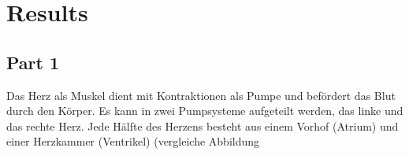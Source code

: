 \chapter{Results}
\label{sec:Results}
\section{Part 1}
\label{sec:07_Herz}
Das Herz als Muskel dient mit Kontraktionen als Pumpe und befördert das Blut durch den Körper. Es kann in zwei Pumpsysteme aufgeteilt werden, das linke und das rechte Herz. Jede Hälfte des Herzens besteht aus einem Vorhof (Atrium) und einer Herzkammer (Ventrikel) (vergleiche Abbildung 